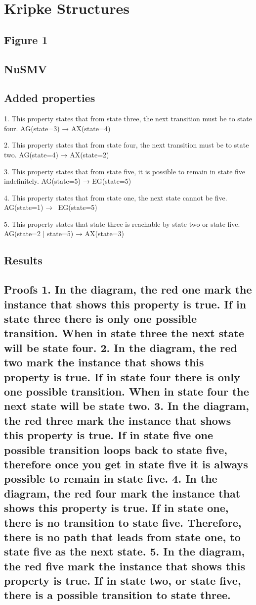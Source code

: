 \documentclass[11pt]{article}
\begin{document}

\section{Kripke Structures} 

\subsection{Figure 1}
	\subsection{NuSMV}
	\subsection{Added properties}
	1. This property states that from state three, the next transition must be to state four.
		AG(state=3) → AX(state=4)

	2. This property states that from state four, the next transition must be to state two.
		AG(state=4) → AX(state=2)

	3. This property states that from state five, it is possible to remain in state five indefinitely.
		AG(state=5) → EG(state=5)

	4. This property states that from state one, the next state cannot be five.
		AG(state=1) → ~EG(state=5)

	5. This property states that state three is reachable by state two or state five.
		AG(state=2 | state=5) → AX(state=3) 
	
	\subsection{Results}
	\subsection{Proofs
1. In the diagram, the red one mark the instance that shows this property is true. If in state three there is only one possible transition. When in state three the next state will be state four.
2. In the diagram, the red two mark the instance that shows this property is true. If in state four there is only one possible transition. When in state four the next state will be state two.
3. In the diagram, the red three mark the instance that shows this property is true. If in state five one possible transition loops back to state five, therefore once you get in state five it is always possible to remain in state five.
4. In the diagram, the red four mark the instance that shows this property is true. If in state one, there is no transition to state five. Therefore, there is no path that leads from state one, to state five as the next state.
5. In the diagram, the red five mark the instance that shows this property is true. If in state two, or state five, there is a possible transition to state three.
	}
\end{document}
